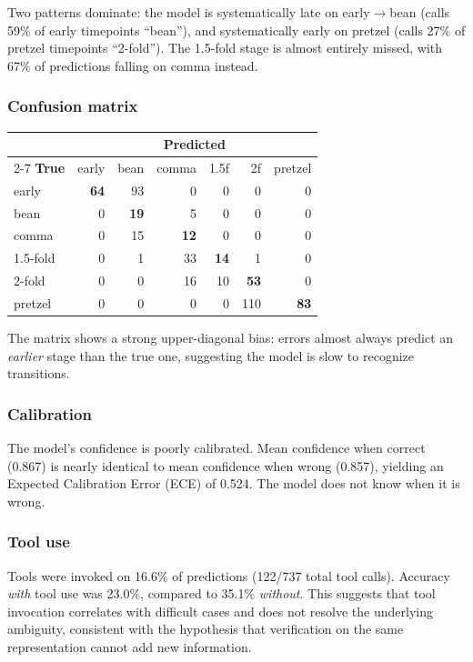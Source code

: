 \documentclass[11pt, a4paper]{article}
\begin{document}
Two patterns dominate: the model is systematically late on early$\to$bean (calls
59\% of early timepoints ``bean''), and systematically early on pretzel (calls
27\% of pretzel timepoints ``2-fold''). The 1.5-fold stage is almost entirely
missed, with 67\% of predictions falling on comma instead.

\subsubsection{Confusion matrix}

\begin{center}
\small
\begin{tabular}{@{}l*{6}{r}@{}}
\toprule
& \multicolumn{6}{c}{\textbf{Predicted}} \\
\cmidrule(l){2-7}
\textbf{True} & early & bean & comma & 1.5f & 2f & pretzel \\
\midrule
early    & \textbf{64} & 93  &  0 &  0 &   0 &  0 \\
bean     &  0 & \textbf{19} &  5 &  0 &   0 &  0 \\
comma    &  0 & 15 & \textbf{12} &  0 &   0 &  0 \\
1.5-fold &  0 &  1 & 33 & \textbf{14} &   1 &  0 \\
2-fold   &  0 &  0 & 16 & 10 &  \textbf{53} &  0 \\
pretzel  &  0 &  0 &  0 &  0 & 110 & \textbf{83} \\
\bottomrule
\end{tabular}
\end{center}

The matrix shows a strong upper-diagonal bias: errors almost always predict an
\emph{earlier} stage than the true one, suggesting the model is slow to recognize
transitions.

\subsubsection{Calibration}

The model's confidence is poorly calibrated. Mean confidence when correct (0.867)
is nearly identical to mean confidence when wrong (0.857), yielding an Expected
Calibration Error (ECE) of 0.524. The model does not know when it is wrong.

\subsubsection{Tool use}

Tools were invoked on 16.6\% of predictions (122/737 total tool calls).
Accuracy \emph{with} tool use was 23.0\%, compared to 35.1\% \emph{without}.
This suggests that tool invocation correlates with difficult cases and does not
resolve the underlying ambiguity, consistent with the hypothesis that
verification on the same representation cannot add new information.
\end{document}

